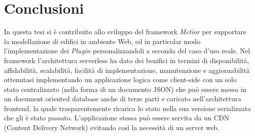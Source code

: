 \section{Conclusioni}
\label{sec:conclusions_section_1}

In questa tesi si è contribuito allo sviluppo del framework \emph{Metior}
per supportare la modellazione di edifici in ambiente Web, ed in particolar modo l'implementazione dei \emph{Plugin}
personalizzandoli a seconda del caso d'uso reale.
Nel framework l'architettura serverless ha dato dei benifici
in termini di disponibilità, affidabilità,  scalabilità, facilità di implementazione, manutenzione e aggiornabilità
ottenutasi implementando un applicazione logica come client-side con un solo stato centralizzato
(nella forma di un documento JSON) che può essere messo in un
document oriented database anche di terze parti e caricato nell'architettura frontend, la quale
trasparentemente ricarica lo stato nella sua versione serializzata che gli è stato passato.
L'applicazione stessa può essere servita da un CDN (Content Delivery Network) evitando così la necessità di un server web.
